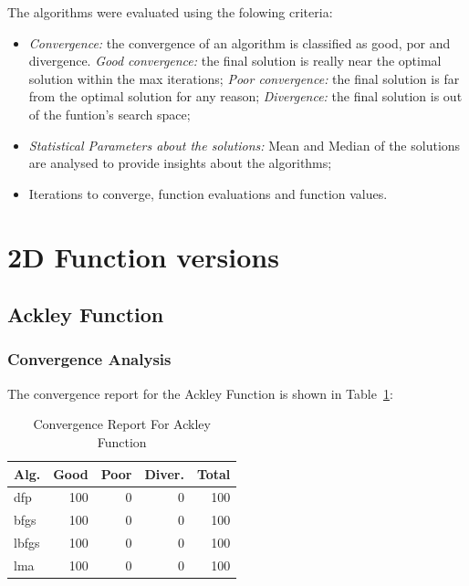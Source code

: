 \documentclass[conference]{IEEEtran}
\begin{document}
The algorithms were evaluated using the folowing criteria:

\begin{itemize}
	\item \textit{Convergence: } the convergence of an algorithm is classified as good, por and divergence.
	\subitem \textit{Good convergence: } the final solution is really near the optimal solution within the max iterations;
	\subitem \textit{Poor convergence: } the final solution is far from the optimal solution for any reason;
	\subitem \textit{Divergence: }  the final solution is out of the funtion's search space;
	\item \textit{Statistical Parameters about the solutions:} Mean and Median of the solutions are analysed to provide insights about the algorithms;
	\item Iterations to converge, function evaluations and function values.
\end{itemize}

\section{2D Function versions}
\label{functions2D}

\subsection{Ackley Function}
\label{ackley2D}

\subsubsection{Convergence Analysis}
\label{convergenceackley2D}


The convergence report for the Ackley Function is shown in Table~\ref{convergence:ackley}:

\begin{table}[H]
\centering
\caption{Convergence Report For Ackley Function}
\label{convergence:ackley}
\begin{tabular}{lrrrr}
\toprule
 Alg. &  Good &  Poor &  Diver. &  Total \\
\midrule
  dfp &   100 &     0 &       0 &    100 \\
 bfgs &   100 &     0 &       0 &    100 \\
lbfgs &   100 &     0 &       0 &    100 \\
  lma &   100 &     0 &       0 &    100 \\
\bottomrule
\end{tabular}
\end{table}
\end{document}
